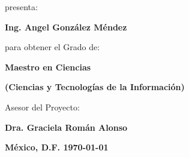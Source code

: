 \centerline{\normalsize presenta:}
\vspace{0.1cm}
\centerline{\Large \bf Ing. Angel González Méndez}
\vspace{0.5cm}
\centerline{\normalsize para obtener el Grado de:}
\vspace{0.1cm}
\centerline{\Large \bf Maestro en Ciencias}
\centerline{\Large \bf (Ciencias y Tecnologías de la Información)}
\vspace{1.0cm}
\centerline{Asesor del Proyecto:}
\vspace{0.1cm}
\centerline{\Large \bf Dra. Graciela Román Alonso}
\vspace{0.5cm}

\vspace{1.2cm}
\begingroup
\setlength{\parindent}{0cm}
{
\large\bf México, D.F. \hfill \mydate\today
}
\endgroup

\restoregeometry